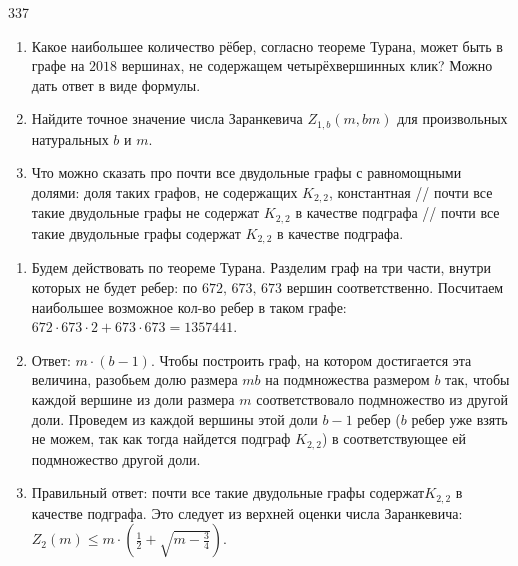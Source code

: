 \begin{task}{337}
\begin{enumerate}
\item Какое наибольшее количество рёбер, согласно теореме Турана, может быть в графе на $2018$ вершинах, не содержащем четырёхвершинных клик? Можно дать ответ в виде формулы.\newline
\item Найдите точное значение числа Заранкевича ${Z}_{1,b}(m,bm)$ для произвольных натуральных $b$ и $m$.\newline
\item Что можно сказать про почти все двудольные графы с равномощными долями: доля таких графов, не содержащих $K_{2,2}$, константная // почти все такие двудольные графы не содержат $K_{2,2}$ в качестве подграфа // почти все такие двудольные графы содержат $K_{2,2}$ в качестве подграфа.
\end{enumerate}
\end{task}

\begin{solution}

\begin{enumerate}
 \item Будем действовать по теореме Турана. Разделим граф на три части, внутри которых не будет ребер: по  $672,\, 673,\, 673$ вершин соответственно. Посчитаем наибольшее возможное кол-во ребер в таком графе: $672\cdot673 \cdot 2 + 673\cdot673 = 1357441$.\par
 \item Ответ: $m\cdot(b-1)$.
Чтобы построить граф, на котором достигается эта величина, разобьем долю размера $mb$ на подмножества размером $b$ так, чтобы каждой вершине из доли размера $m$ соответствовало подмножество из другой доли. Проведем из каждой вершины этой доли $b - 1$ ребер ($b$ ребер уже взять не можем, так как тогда найдется подграф $K_{2,2}$) в соответствующее ей подмножество другой доли.
\item Правильный ответ: почти все такие двудольные графы содержат$K_{2,2}$ в качестве подграфа. Это следует из верхней оценки числа Заранкевича: $Z_2(m) \leq m\cdot \left(\frac{1}{2} + \sqrt{m - \frac{3}{4}} \right)$.\par
\end{enumerate}
\end{solution}